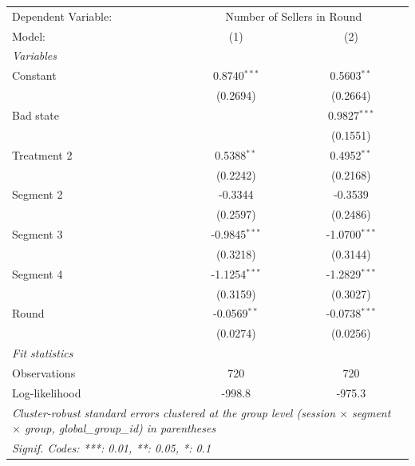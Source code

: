 
\begingroup
\centering
\scriptsize
\begin{tabular}{lcc}
   \tabularnewline \midrule \midrule
   Dependent Variable: & \multicolumn{2}{c}{Number of Sellers in Round}\\
   Model:               & (1)  & (2)\\
   \midrule
   \emph{Variables}\\
   Constant                  & 0.8740$^{***}$ & 0.5603$^{**}$\\
                             & (0.2694) & (0.2664)\\
   Bad state                 &  & 0.9827$^{***}$\\
                             &  & (0.1551)\\
   Treatment 2               & 0.5388$^{**}$ & 0.4952$^{**}$\\
                             & (0.2242) & (0.2168)\\
   Segment 2                 & -0.3344 & -0.3539\\
                             & (0.2597) & (0.2486)\\
   Segment 3                 & -0.9845$^{***}$ & -1.0700$^{***}$\\
                             & (0.3218) & (0.3144)\\
   Segment 4                 & -1.1254$^{***}$ & -1.2829$^{***}$\\
                             & (0.3159) & (0.3027)\\
   Round                     & -0.0569$^{**}$ & -0.0738$^{***}$\\
                             & (0.0274) & (0.0256)\\
   \midrule
   \emph{Fit statistics}\\
   Observations              & 720 & 720\\
   Log-likelihood            & -998.8 & -975.3\\
   \midrule \midrule
   \multicolumn{3}{l}{\emph{Cluster-robust standard errors clustered at the group level (session $\times$ segment $\times$ group, global\_group\_id) in parentheses}}\\
   \multicolumn{3}{l}{\emph{Signif. Codes: ***: 0.01, **: 0.05, *: 0.1}}\\
\end{tabular}
\par\endgroup



